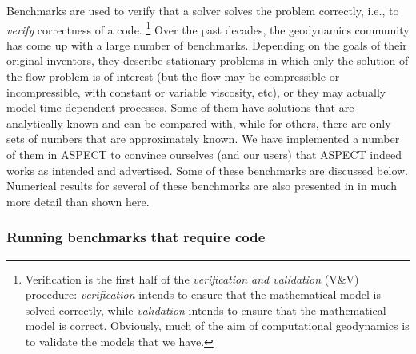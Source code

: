 \documentclass{article}
\newcommand{\aspect}{\textsc{ASPECT}}
\begin{document}
Benchmarks are used to verify that a solver solves the problem correctly,
i.e., to \textit{verify} correctness of a code.%
\footnote{Verification is the first half of the \textit{verification and
    validation} (V\&V) procedure: \textit{verification} intends to ensure that the
  mathematical model is solved correctly, while \textit{validation} intends to
  ensure that the mathematical model is correct. Obviously, much of the aim of
  computational geodynamics is to validate the models that we have.}
Over the past decades, the geodynamics community has come up with a large
number of benchmarks. Depending on the goals of their original inventors, they
describe stationary problems in which only the solution of the flow problem is
of interest (but the flow may be compressible or incompressible, with constant
or variable viscosity, etc), or they may actually model time-dependent
processes. Some of them have solutions that are analytically known and can be
compared with, while for others, there are only sets of numbers that are
approximately known. We have implemented a number of them in \aspect{} to
convince ourselves (and our users) that \aspect{} indeed works as intended and
advertised. Some of these benchmarks are discussed below. Numerical results
for several of these benchmarks are also presented in \cite{KHB12} in much more
detail than shown here.

\subsubsection{Running benchmarks that require code}
\label{sec:benchmark-run}
\end{document}
